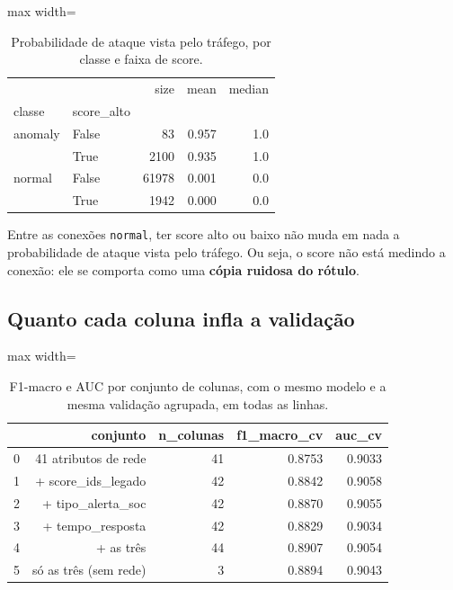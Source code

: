 \documentclass[11pt,a4paper]{article}
\begin{document}
\begin{table}[H]
\centering
\caption{Probabilidade de ataque vista pelo tráfego, por classe e faixa de score.}
\begin{adjustbox}{max width=\linewidth}
\begin{tabular}{llrrr}
\toprule
 &  & size & mean & median \\
classe & score\_alto &  &  &  \\
\midrule
anomaly & False & 83 & 0.957 & 1.0 \\
 & True & 2100 & 0.935 & 1.0 \\
normal & False & 61978 & 0.001 & 0.0 \\
 & True & 1942 & 0.000 & 0.0 \\
\bottomrule
\end{tabular}
\end{adjustbox}
\end{table}

Entre as conexões \texttt{normal}, ter score alto ou baixo não muda em nada a probabilidade de ataque vista pelo tráfego. Ou seja, o score não está medindo a conexão: ele se comporta como uma \textbf{cópia ruidosa do rótulo}.

\subsection{Quanto cada coluna infla a validação}

\begin{table}[H]
\centering
\caption{F1-macro e AUC por conjunto de colunas, com o mesmo modelo e a mesma validação agrupada, em todas as linhas.}
\begin{adjustbox}{max width=\linewidth}
\begin{tabular}{lrrrr}
\toprule
 & conjunto & n\_colunas & f1\_macro\_cv & auc\_cv \\
\midrule
0 & 41 atributos de rede & 41 & 0.8753 & 0.9033 \\
1 & + score\_ids\_legado & 42 & 0.8842 & 0.9058 \\
2 & + tipo\_alerta\_soc & 42 & 0.8870 & 0.9055 \\
3 & + tempo\_resposta & 42 & 0.8829 & 0.9034 \\
4 & + as três & 44 & 0.8907 & 0.9054 \\
5 & só as três (sem rede) & 3 & 0.8894 & 0.9043 \\
\bottomrule
\end{tabular}
\end{adjustbox}
\end{table}
\end{document}

